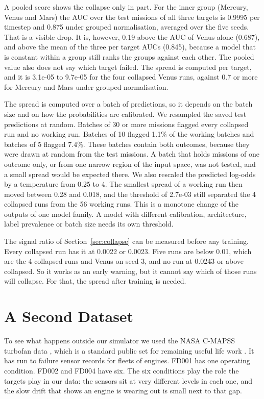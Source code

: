 \documentclass[preprint,12pt,authoryear]{elsarticle}
\begin{document}
A pooled score shows the collapse only in part. For the inner group (Mercury, Venus and Mars) the AUC over the test missions of all three targets is 0.9995 per timestep and 0.875 under grouped normalisation, averaged over the five seeds. That is a visible drop. It is, however, 0.19 above the AUC of Venus alone (0.687), and above the mean of the three per target AUCs (0.845), because a model that is constant within a group still ranks the groups against each other. The pooled value also does not say which target failed. The spread is computed per target, and it is 3.1e-05 to 9.7e-05 for the four collapsed Venus runs, against 0.7 or more for Mercury and Mars under grouped normalisation.

The spread is computed over a batch of predictions, so it depends on the batch size and on how the probabilities are calibrated. We resampled the saved test predictions at random. Batches of 30 or more missions flagged every collapsed run and no working run. Batches of 10 flagged 1.1\% of the working batches and batches of 5 flagged 7.4\%. These batches contain both outcomes, because they were drawn at random from the test missions. A batch that holds missions of one outcome only, or from one narrow region of the input space, was not tested, and a small spread would be expected there. We also rescaled the predicted log-odds by a temperature from 0.25 to 4. The smallest spread of a working run then moved between 0.28 and 0.018, and the threshold of 2.7e-03 still separated the 4 collapsed runs from the 56 working runs. This is a monotone change of the outputs of one model family. A model with different calibration, architecture, label prevalence or batch size needs its own threshold.

The signal ratio of Section~\ref{sec:collapse} can be measured before any training. Every collapsed run has it at 0.0022 or 0.0023. Five runs are below 0.01, which are the 4 collapsed runs and Venus on seed 3, and no run at 0.0243 or above collapsed. So it works as an early warning, but it cannot say which of those runs will collapse. For that, the spread after training is needed.

\section{A Second Dataset}
\label{sec:second}

To see what happens outside our simulator we used the NASA C-MAPSS turbofan data \citep{saxena2008}, which is a standard public set for remaining useful life work \citep{li2018rul}. It has run to failure sensor records for fleets of engines. FD001 has one operating condition. FD002 and FD004 have six. The six conditions play the role the targets play in our data: the sensors sit at very different levels in each one, and the slow drift that shows an engine is wearing out is small next to that gap.
\end{document}
